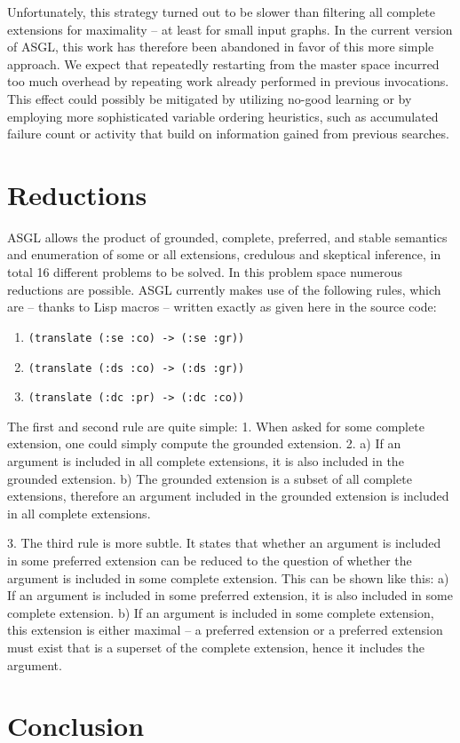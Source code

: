 \documentclass[runningheads,a4paper]{llncs}
\begin{document}
Unfortunately, this strategy turned out to be slower than filtering
all complete extensions for maximality -- at least for small input
graphs. In the current version of ASGL, this work has therefore been
abandoned in favor of this more simple approach. We expect that
repeatedly restarting from the master space incurred too much overhead
by repeating work already performed in previous invocations. This
effect could possibly be mitigated by utilizing no-good learning or by
employing more sophisticated variable ordering heuristics, such as
accumulated failure count or activity that build on
information gained from previous searches.

\section{Reductions}\label{sec:reductions}

ASGL allows the product of grounded, complete, preferred, and stable
semantics and enumeration of some or all extensions, credulous and
skeptical inference, in total 16 different problems to be solved. In
this problem space numerous reductions are possible. ASGL currently
makes use of the following rules, which are -- thanks to Lisp macros
-- written exactly as given here in the source code:

\begin{enumerate}
\item \texttt{(translate (:se :co) -> (:se :gr))}
\item \texttt{(translate (:ds :co) -> (:ds :gr))}
\item \texttt{(translate (:dc :pr) -> (:dc :co))}
\end{enumerate}

The first and second rule are quite simple: 1. When asked for some
complete extension, one could simply compute the grounded
extension. 2. a) If an argument is included in all complete extensions,
it is also included in the grounded extension. b) The grounded extension
is a subset of all complete extensions, therefore an argument included
in the grounded extension is included in all complete extensions.

3. The third rule is more subtle. It states that whether an argument
is included in some preferred extension can be reduced to the question
of whether the argument is included in some complete extension. This
can be shown like this: a) If an argument is included in some
preferred extension, it is also included in some complete
extension. b) If an argument is included in some complete extension,
this extension is either maximal -- a preferred extension or a
preferred extension must exist that is a superset of the complete
extension, hence it includes the argument.

\section{Conclusion}\label{sec:conclusion}

{}

\end{document}
